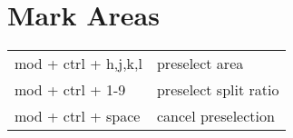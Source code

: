 \documentclass[
    a4paper,
    10pt,
    notitlepage,
    egregdoesnotlikesansseriftitles
]{scrartcl}
\begin{document}
\section{Mark Areas}
\begin{tabular}{p{4cm}l}
    mod + ctrl + h,j,k,l  & preselect area                    \\
    mod + ctrl + 1-9      & preselect split ratio             \\
    mod + ctrl + space    & cancel preselection
\end{tabular}

\end{document}
